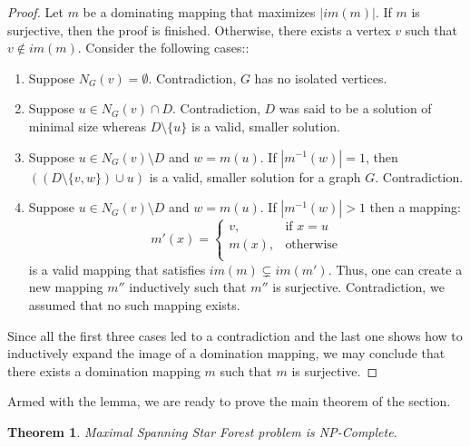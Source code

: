 \documentclass[en]{pracamgr}
\newtheorem{theorem}{Theorem}
\newcommand{\mssfp}{{\sc Maximal Spanning Star Forest} problem}
\begin{document}
\begin{proof}
	Let $m$ be a dominating mapping that maximizes $|im(m)|$. If $m$ is surjective, then the proof is finished. Otherwise, there exists a vertex $v$ such that $v \notin im(m)$. Consider the following cases::
	\begin{enumerate}
		\item Suppose $N_G(v) = \emptyset$. Contradiction, $G$ has no isolated vertices.
		\item Suppose $u \in N_G(v) \cap D$. Contradiction, $D$ was said to be a solution of minimal size whereas $D \setminus \{u\}$ is a valid, smaller solution.
		\item Suppose $u \in N_{G}(v) \setminus D$ and $w = m(u)$. If $|m^{-1}(w)|=1$, then $((D \setminus \{v,w\}) \cup u)$ is a valid, smaller solution for a graph $G$. Contradiction.
		\item Suppose $u \in N_{G}(v) \setminus D$ and $w = m(u)$. If $|m^{-1}(w)| > 1$ then a mapping:
		\begin{equation*}
			m'(x) = \begin{cases}
			v, & \text{if }x = u \\
			m(x), &\text{otherwise} \\
			\end{cases}
		\end{equation*}
		is a valid mapping that satisfies $im(m) \subsetneq im(m')$. Thus, one can create a new mapping $m''$ inductively such that $m''$ is surjective. Contradiction, we assumed that no such mapping exists. 
	\end{enumerate}
	
	Since all the first three cases led to a contradiction and the last one shows how to inductively expand the image of a domination mapping, we may conclude that there exists a domination mapping $m$ such that $m$ is surjective.  
\end{proof}

Armed with the lemma, we are ready to prove the main theorem of the section.

\begin{theorem}\label{dom ssf}
	\mssfp{} is NP-Complete.
\end{theorem}
\end{document}
